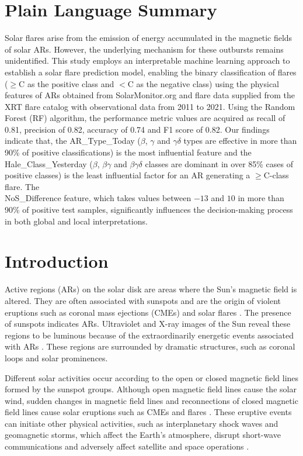 \documentclass[draft]{agujournal2019}
\begin{document}
\section*{Plain Language Summary}
Solar flares arise from the emission of energy accumulated in the magnetic fields of solar ARs. However, the underlying mechanism for these outbursts remains unidentified. This study employs an interpretable machine learning approach to establish a solar flare prediction model, enabling the binary classification of flares ($\geq$C as the positive class and $<$C as the negative class) using the physical features of ARs obtained from SolarMonitor.org and flare data supplied from the XRT flare catalog with observational data from 2011 to 2021. 
Using the Random Forest (RF) algorithm, the performance metric values are acquired as recall of 0.81, precision of 0.82, accuracy of 0.74 and F1 score of 0.82.  
Our findings indicate that, the AR\_Type\_Today ($\beta$, $\gamma$ and $\gamma$$\delta$ types are effective in more than 90\% of positive classifications) is the most influential feature and the \\
Hale\_Class\_Yesterday ($\beta$, $\beta$$\gamma$ and $\beta$$\gamma$$\delta$ classes are dominant in over 85\% cases of positive classes) is the least influential factor for an AR generating a $\geq$C-class flare. 
The \\
NoS\_Difference feature, which takes values between $-13$ and $10$ in more than 90\% of positive test samples, significantly influences the decision-making process in both global and local interpretations.

\section{Introduction}
Active regions (ARs) on the solar disk are areas where the Sun's magnetic field is altered. They are often associated with sunspots and are the origin of violent eruptions such as coronal mass ejections (CMEs) and solar flares \citep{1995A&A...304..585H}.
The presence of sunspots indicates ARs. Ultraviolet and X-ray images of the Sun reveal these regions to be luminous because of the extraordinarily energetic events associated with ARs
\citep{1963ARA&A...1...59F}. 
These regions are surrounded by dramatic structures, such as coronal loops and solar prominences.

Different solar activities occur according to the open or closed magnetic field lines formed by the sunspot groups. Although open magnetic field lines cause the solar wind, sudden changes in magnetic field lines and reconnections of closed magnetic field lines cause solar eruptions such as CMEs and flares \citep{Priest_2014}. These eruptive events can initiate other physical activities, such as interplanetary shock waves
and geomagnetic storms, which affect the Earth's atmosphere, disrupt short-wave communications and adversely affect satellite and space operations
\citep{2022Univ....8...39M,2015ApJ...814...59V}.
\end{document}

